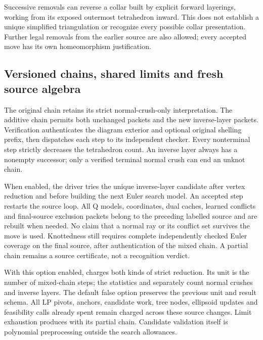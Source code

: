 Successive removals can reverse a collar built by explicit forward
layerings, working from its exposed outermost tetrahedron inward.
This does not establish a unique simplified triangulation or recognize
every possible collar presentation.  Further legal removals from the
earlier source are also allowed; every accepted move has its own
homeomorphism justification.

\subsection{Versioned chains, shared limits and fresh source algebra}

The original  chain retains its strict
normal-crush-only interpretation.  The additive
 chain permits both unchanged
 packets and the new inverse-layer packets.
Verification authenticates the diagram exterior and optional original
shelling prefix, then dispatches each step to its independent checker.
Every nonterminal step strictly decreases the tetrahedron count.
An inverse layer always has a nonempty successor; only a verified
terminal normal crush can end an unknot chain.

When enabled, the driver tries the unique inverse-layer candidate after
vertex reduction and before building the next Euler search model.
An accepted step restarts the source loop.  All Q models, coordinates,
dual caches, learned conflicts and final-source exclusion packets belong
to the preceding labelled source and are rebuilt when needed.  No claim
that a normal ray or its conflict set survives the move is used.
Knottedness still requires complete independently checked Euler coverage
on the final source, after authentication of the mixed chain.  A partial
chain remains a  source certificate, not a recognition
verdict.

With this option enabled,  charges both kinds of
strict reduction.  Its unit is the number of mixed-chain steps; the
statistics  and 
separately count normal crushes and inverse layers.  The default false
option preserves the previous unit and result schema.  All LP pivots,
anchors, candidate work, tree nodes, ellipsoid updates and feasibility
calls already spent remain charged across these source changes.
Limit exhaustion produces  with its partial chain.
Candidate validation itself is polynomial preprocessing outside the
search allowances.

